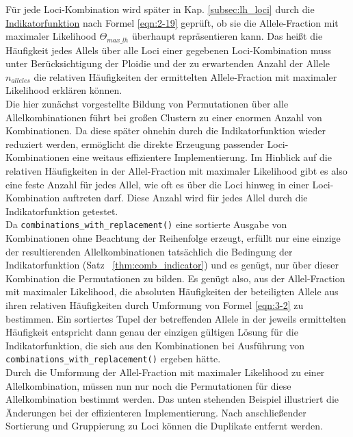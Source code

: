 Für jede Loci-Kombination wird später in Kap. \ref{subsec:lh_loci} durch die \hyperref[schritt14a]{Indikatorfunktion\label{schritt14atxt}} nach Formel \eqref{eqn:2-19} geprüft, ob sie die Allele-Fraction mit maximaler Likelihood $\Theta_{max\_lh}$ überhaupt repräsentieren kann. Das heißt die Häufigkeit jedes Allels über alle Loci einer gegebenen Loci-Kombination muss unter Berücksichtigung der Ploidie und der zu erwartenden Anzahl der Allele $n_{alleles}$ die relativen Häufigkeiten der ermittelten Allele-Fraction mit maximaler Likelihood erklären können. \\

Die hier zunächst vorgestellte Bildung von Permutationen über alle Allelkombinationen führt bei großen Clustern zu einer enormen Anzahl von Kombinationen. Da diese später ohnehin durch die Indikatorfunktion wieder reduziert werden, ermöglicht die direkte Erzeugung passender Loci-Kombinationen eine weitaus effizientere Implementierung. Im Hinblick auf die relativen Häufigkeiten in der Allel-Fraction mit maximaler Likelihood gibt es also eine feste Anzahl für jedes Allel, wie oft es über die Loci hinweg in einer Loci-Kombination auftreten darf. Diese Anzahl wird für jedes Allel durch die Indikatorfunktion getestet.\\

Da \lstinline|combinations_with_replacement()| eine sortierte Ausgabe von Kombinationen ohne Beachtung der Reihenfolge erzeugt, erfüllt nur eine einzige der resultierenden Allelkombinationen tatsächlich die Bedingung der Indikatorfunktion (Satz ~\ref{thm:comb_indicator}) und es genügt, nur über dieser Kombination die Permutationen zu bilden. Es genügt also, aus der Allel-Fraction mit maximaler Likelihood, die absoluten Häufigkeiten der beteiligten Allele aus ihren relativen Häufigkeiten durch Umformung von Formel \eqref{eqn:3-2} zu bestimmen. Ein sortiertes Tupel der betreffenden Allele in der jeweils ermittelten Häufigkeit entspricht dann genau der einzigen gültigen Lösung für die Indikatorfunktion, die sich aus den Kombinationen bei Ausführung von \lstinline|combinations_with_replacement()| ergeben hätte.\\

Durch die Umformung der Allel-Fraction mit maximaler Likelihood zu einer Allelkombination, müssen nun nur noch die Permutationen für diese Allelkombination bestimmt werden. Das unten stehenden Beispiel illustriert die Änderungen bei der effizienteren Implementierung. Nach anschließender Sortierung und Gruppierung zu Loci können die Duplikate entfernt werden. \\


